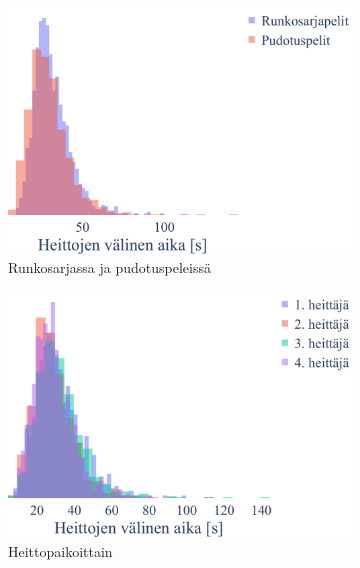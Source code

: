     \begin{figure}[!ht]
        \centering
        \begin{subfigure}[b]{0.49\textwidth}
            \centering
            \includegraphics[width=\textwidth]{figures/heitot1.pdf}
            \caption{Runkosarjassa ja pudotuspeleissä\label{fig:throw_games}}
        \end{subfigure}
        \hfill
        \begin{subfigure}[b]{0.49\textwidth}
            \centering
            \includegraphics[width=\textwidth]{figures/heitot2.pdf}
            \caption{Heittopaikoittain\label{fig:throw_position}}
        \end{subfigure}
        \vspace{\baselineskip}
        \begin{subfigure}[b]{0.49\textwidth}

\end{subfigure}
\end{figure}
